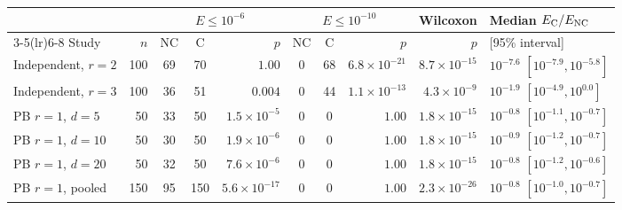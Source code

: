 \begin{tabular}{@{}lr cc r cc r r l@{}}
\toprule
 & & \multicolumn{3}{c}{$E\le10^{-6}$} & \multicolumn{3}{c}{$E\le10^{-10}$} & Wilcoxon & Median $E_{\rm C}/E_{\rm NC}$\\
\cmidrule(lr){3-5}\cmidrule(lr){6-8}
Study & $n$ & NC & C & $p$ & NC & C & $p$ & $p$ & [95\% interval]\\
\midrule
Independent, $r=2$ & 100 & 69 & 70 & $1.00$ & 0 & 68 & $6.8\times10^{-21}$ & $8.7\times10^{-15}$ & $10^{-7.6}$ $[10^{-7.9},10^{-5.8}]$\\
Independent, $r=3$ & 100 & 36 & 51 & $0.004$ & 0 & 44 & $1.1\times10^{-13}$ & $4.3\times10^{-9}$ & $10^{-1.9}$ $[10^{-4.9},10^{0.0}]$\\
PB $r=1$, $d=5$ & 50 & 33 & 50 & $1.5\times10^{-5}$ & 0 & 0 & $1.00$ & $1.8\times10^{-15}$ & $10^{-0.8}$ $[10^{-1.1},10^{-0.7}]$\\
PB $r=1$, $d=10$ & 50 & 30 & 50 & $1.9\times10^{-6}$ & 0 & 0 & $1.00$ & $1.8\times10^{-15}$ & $10^{-0.9}$ $[10^{-1.2},10^{-0.7}]$\\
PB $r=1$, $d=20$ & 50 & 32 & 50 & $7.6\times10^{-6}$ & 0 & 0 & $1.00$ & $1.8\times10^{-15}$ & $10^{-0.8}$ $[10^{-1.2},10^{-0.6}]$\\
PB $r=1$, pooled & 150 & 95 & 150 & $5.6\times10^{-17}$ & 0 & 0 & $1.00$ & $2.3\times10^{-26}$ & $10^{-0.8}$ $[10^{-1.0},10^{-0.7}]$\\
\bottomrule
\end{tabular}
